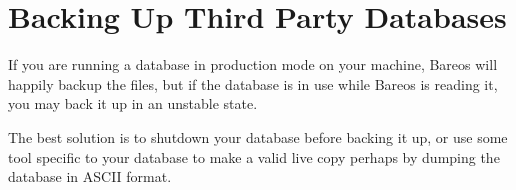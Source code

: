 \section{Backing Up Third Party Databases}
\label{BackingUPOtherDBs}

If you are running a database in production mode on your machine, Bareos will
happily backup the files, but if the database is in use while Bareos is
reading it, you may back it up in an unstable state.

The best solution is to shutdown your database before backing it up, or use
some tool specific to your database to make a valid live copy perhaps by
dumping the database in ASCII format.
